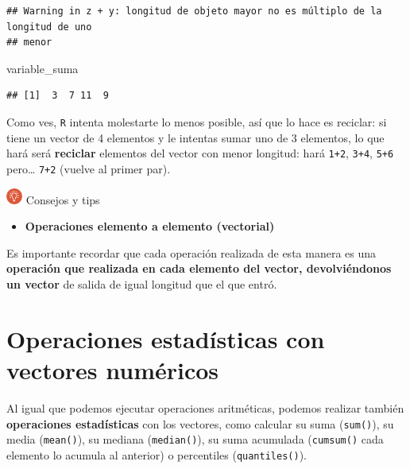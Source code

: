 \documentclass[11pt,]{book}
\newenvironment{Shaded}{\begin{snugshade}}{\end{snugshade}}
\newcommand{\NormalTok}[1]{#1}
\providecommand{\tightlist}{%
  \setlength{\itemsep}{0pt}\setlength{\parskip}{0pt}}
\begin{document}
\begin{verbatim}
## Warning in z + y: longitud de objeto mayor no es múltiplo de la longitud de uno
## menor
\end{verbatim}

\begin{Shaded}
\begin{Highlighting}[]
\NormalTok{variable_suma}
\end{Highlighting}
\end{Shaded}

\begin{verbatim}
## [1]  3  7 11  9
\end{verbatim}

Como ves, \texttt{R} intenta molestarte lo menos posible, así que lo hace es reciclar: si tiene un vector de 4 elementos y le intentas sumar uno de 3 elementos, lo que hará será \textbf{reciclar} elementos del vector con menor longitud: hará \texttt{1+2}, \texttt{3+4}, \texttt{5+6} pero\ldots{} \texttt{7+2} (vuelve al primer par).\\
\hspace*{0.333em}

\includegraphics[width=0.04\textwidth,height=\textheight]{img/logo_info.png} Consejos y tips

\begin{itemize}
\tightlist
\item
  \textbf{Operaciones elemento a elemento (vectorial)}
\end{itemize}

Es importante recordar que cada operación realizada de esta manera es una \textbf{operación que realizada en cada elemento del vector, devolviéndonos un vector} de salida de igual longitud que el que entró.

\hypertarget{operaciones-estaduxedsticas-con-vectores-numuxe9ricos}{%
\section{Operaciones estadísticas con vectores numéricos}\label{operaciones-estaduxedsticas-con-vectores-numuxe9ricos}}

Al igual que podemos ejecutar operaciones aritméticas, podemos realizar también \textbf{operaciones estadísticas} con los vectores, como calcular su suma (\texttt{sum()}), su media (\texttt{mean()}), su mediana (\texttt{median()}), su suma acumulada (\texttt{cumsum()} cada elemento lo acumula al anterior) o percentiles (\texttt{quantiles()}).
\end{document}
